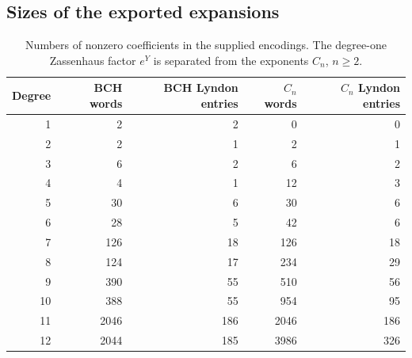 \subsection{Sizes of the exported expansions}
\begin{table}[htbp]
\centering\small
\begin{tabular}{@{}rrrrr@{}}
\toprule
Degree & BCH words & BCH Lyndon entries & $C_n$ words & $C_n$ Lyndon entries\\
\midrule
1 & 2 & 2 & 0 & 0 \\
2 & 2 & 1 & 2 & 1 \\
3 & 6 & 2 & 6 & 2 \\
4 & 4 & 1 & 12 & 3 \\
5 & 30 & 6 & 30 & 6 \\
6 & 28 & 5 & 42 & 6 \\
7 & 126 & 18 & 126 & 18 \\
8 & 124 & 17 & 234 & 29 \\
9 & 390 & 55 & 510 & 56 \\
10 & 388 & 55 & 954 & 95 \\
11 & 2046 & 186 & 2046 & 186 \\
12 & 2044 & 185 & 3986 & 326 \\
\bottomrule
\end{tabular}
\caption{Numbers of nonzero coefficients in the supplied encodings. The
degree-one Zassenhaus factor $e^{Y}$ is separated from the exponents $C_n$,
$n\geq2$.}\label{tab:counts}
\end{table}

